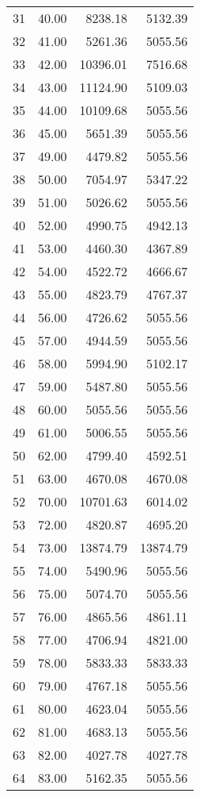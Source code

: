 \begin{table}[ht]
\begin{tabular}{rrrr}
  31 & 40.00 & 8238.18 & 5132.39 \\ 
  32 & 41.00 & 5261.36 & 5055.56 \\ 
  33 & 42.00 & 10396.01 & 7516.68 \\ 
  34 & 43.00 & 11124.90 & 5109.03 \\ 
  35 & 44.00 & 10109.68 & 5055.56 \\ 
  36 & 45.00 & 5651.39 & 5055.56 \\ 
  37 & 49.00 & 4479.82 & 5055.56 \\ 
  38 & 50.00 & 7054.97 & 5347.22 \\ 
  39 & 51.00 & 5026.62 & 5055.56 \\ 
  40 & 52.00 & 4990.75 & 4942.13 \\ 
  41 & 53.00 & 4460.30 & 4367.89 \\ 
  42 & 54.00 & 4522.72 & 4666.67 \\ 
  43 & 55.00 & 4823.79 & 4767.37 \\ 
  44 & 56.00 & 4726.62 & 5055.56 \\ 
  45 & 57.00 & 4944.59 & 5055.56 \\ 
  46 & 58.00 & 5994.90 & 5102.17 \\ 
  47 & 59.00 & 5487.80 & 5055.56 \\ 
  48 & 60.00 & 5055.56 & 5055.56 \\ 
  49 & 61.00 & 5006.55 & 5055.56 \\ 
  50 & 62.00 & 4799.40 & 4592.51 \\ 
  51 & 63.00 & 4670.08 & 4670.08 \\ 
  52 & 70.00 & 10701.63 & 6014.02 \\ 
  53 & 72.00 & 4820.87 & 4695.20 \\ 
  54 & 73.00 & 13874.79 & 13874.79 \\ 
  55 & 74.00 & 5490.96 & 5055.56 \\ 
  56 & 75.00 & 5074.70 & 5055.56 \\ 
  57 & 76.00 & 4865.56 & 4861.11 \\ 
  58 & 77.00 & 4706.94 & 4821.00 \\ 
  59 & 78.00 & 5833.33 & 5833.33 \\ 
  60 & 79.00 & 4767.18 & 5055.56 \\ 
  61 & 80.00 & 4623.04 & 5055.56 \\ 
  62 & 81.00 & 4683.13 & 5055.56 \\ 
  63 & 82.00 & 4027.78 & 4027.78 \\ 
  64 & 83.00 & 5162.35 & 5055.56 \\ 

\end{tabular}
\end{table}

